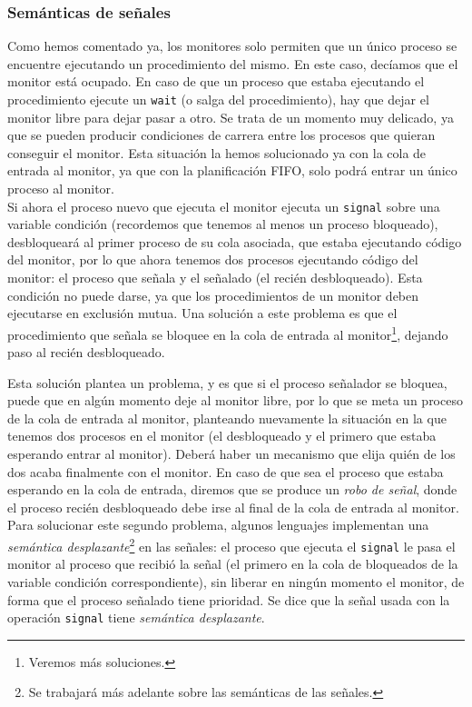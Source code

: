 \subsubsection{Semánticas de señales}
Como hemos comentado ya, los monitores solo permiten que un único proceso se encuentre ejecutando un procedimiento del mismo. En este caso, decíamos que el monitor está ocupado. En caso de que un proceso que estaba ejecutando el procedimiento ejecute un \verb|wait| (o salga del procedimiento), hay que dejar el monitor libre para dejar pasar a otro. Se trata de un momento muy delicado, ya que se pueden producir condiciones de carrera entre los procesos que quieran conseguir el monitor. Esta situación la hemos solucionado ya con la cola de entrada al monitor, ya que con la planificación FIFO, solo podrá entrar un único proceso al monitor.\\

Si ahora el proceso nuevo que ejecuta el monitor ejecuta un \verb|signal| sobre una variable condición (recordemos que tenemos al menos un proceso bloqueado), desbloqueará al primer proceso de su cola asociada, que estaba ejecutando código del monitor, por lo que ahora tenemos dos procesos ejecutando código del monitor: el proceso que señala y el señalado (el recién desbloqueado). Esta condición no puede darse, ya que los procedimientos de un monitor deben ejecutarse en exclusión mutua. Una solución a este problema es que el procedimiento que señala se bloquee en la cola de entrada al monitor\footnote{Veremos más soluciones.}, dejando paso al recién desbloqueado.

Esta solución plantea un problema, y es que si el proceso señalador se bloquea, puede que en algún momento deje al monitor libre, por lo que se meta un proceso de la cola de entrada al monitor, planteando nuevamente la situación en la que tenemos dos procesos en el monitor (el desbloqueado y el primero que estaba esperando entrar al monitor). Deberá haber un mecanismo que elija quién de los dos acaba finalmente con el monitor. En caso de que sea el proceso que estaba esperando en la cola de entrada, diremos que se produce un \emph{robo de señal}, donde el proceso recién desbloqueado debe irse al final de la cola de entrada al monitor.\\

Para solucionar este segundo problema, algunos lenguajes implementan una \emph{semántica desplazante}\footnote{Se trabajará más adelante sobre las semánticas de las señales.} en las señales: el proceso que ejecuta el \verb|signal| le pasa el monitor al proceso que recibió la señal (el primero en la cola de bloqueados de la variable condición correspondiente), sin liberar en ningún momento el monitor, de forma que el proceso señalado tiene prioridad. Se dice que la señal usada con la operación \verb|signal| tiene \emph{semántica desplazante}.\\

